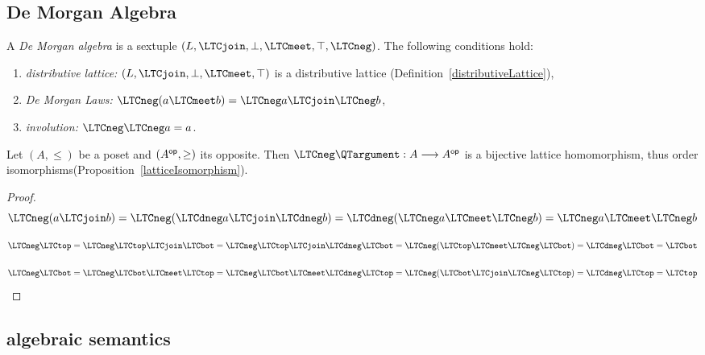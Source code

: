 \subsection{De Morgan Algebra}

\begin{definition} 
A {\em De Morgan algebra} is a sextuple  
$(L,\LTCjoin,\bot,\LTCmeet,\top,\LTCneg)$.
The following conditions hold:
\begin{enumerate}
\item {\em distributive lattice:}
 $(L,\LTCjoin,\bot,\LTCmeet,\top)$ is a  distributive lattice (Definition~\ref{distributiveLattice}),
\item {\em De Morgan Laws:}
$\LTCneg(a \LTCmeet b) = \LTCneg a \LTCjoin \LTCneg b$,
\item {\em involution:}  $\LTCneg\LTCneg a = a$. 
\end{enumerate}
\end{definition}

\begin{proposition}
Let $(A,\leq)$ be a poset and  $(A^{\sf op},\geq)$ its opposite. 
Then $ \LTCneg\QTargument : A \longrightarrow A^{\sf op}$ 
is a bijective lattice homomorphism,
thus order isomorphisms(Proposition~\ref{latticeIsomorphism}).
\end{proposition}
\begin{proof}

\[  \LTCneg ( a \LTCjoin b) 
= \LTCneg ( \LTCdneg a \LTCjoin \LTCdneg b)
= \LTCdneg ( \LTCneg a \LTCmeet \LTCneg b)
= \LTCneg a \LTCmeet \LTCneg b
\]

\[ \LTCneg\LTCtop
= \LTCneg\LTCtop \LTCjoin \LTCbot
= \LTCneg\LTCtop \LTCjoin \LTCdneg\LTCbot
= \LTCneg (\LTCtop \LTCmeet \LTCneg\LTCbot)
= \LTCdneg\LTCbot
= \LTCbot
\]

\[ \LTCneg\LTCbot
= \LTCneg\LTCbot \LTCmeet \LTCtop
= \LTCneg\LTCbot \LTCmeet \LTCdneg\LTCtop
= \LTCneg (\LTCbot \LTCjoin \LTCneg\LTCtop)
= \LTCdneg\LTCtop
= \LTCtop
\]

\end{proof}

\subsection{algebraic semantics}

